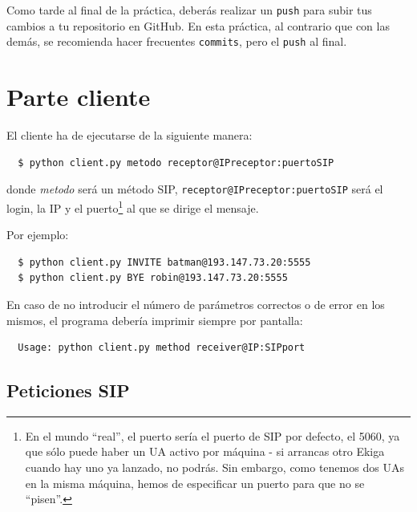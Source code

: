 \documentclass[a4paper,11pt]{article}
\begin{document}
 Como tarde al final de la práctica, deberás realizar un \texttt{push} para subir tus cambios a tu repositorio en GitHub. En esta práctica, al contrario que con las demás, se recomienda hacer frecuentes \texttt{commits}, pero el \texttt{push} al final.


\section*{Parte cliente}

El cliente ha de ejecutarse de la siguiente manera:
\begin{verbatim}
  $ python client.py metodo receptor@IPreceptor:puertoSIP
\end{verbatim}

donde \emph{metodo} será un método SIP, \texttt{receptor@IPreceptor:puertoSIP}
será el login, la IP y el puerto\footnote{En el mundo ``real'', el puerto sería 
el puerto de SIP por defecto, el 5060, ya que sólo puede haber un UA activo
por máquina - si arrancas otro Ekiga cuando hay uno ya lanzado, no podrás.
Sin embargo, como tenemos dos UAs en la
misma máquina, hemos de especificar un puerto para que no se ``pisen''.}
al que se dirige el mensaje.

Por ejemplo:
\begin{verbatim}
  $ python client.py INVITE batman@193.147.73.20:5555
  $ python client.py BYE robin@193.147.73.20:5555
\end{verbatim}

En caso de no introducir el número de parámetros correctos o de error en los mismos, el programa debería imprimir siempre por pantalla:
\begin{verbatim}
  Usage: python client.py method receiver@IP:SIPport
\end{verbatim}

\subsection*{Peticiones SIP}
\end{document}
